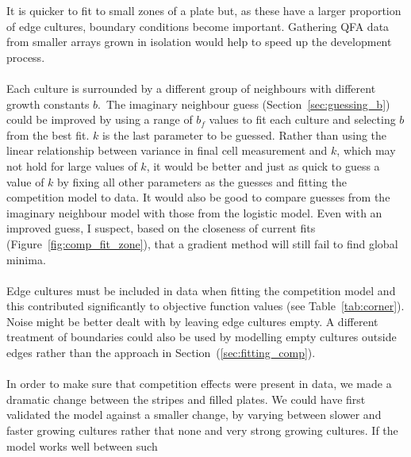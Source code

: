 It is quicker to fit to small zones of a plate but, as these have a
larger proportion of edge cultures, boundary conditions become
important. Gathering QFA data from smaller arrays grown in isolation
would help to speed up the development process.
\\\\
Each culture is surrounded by a different group of neighbours with
different growth constants \(b\).~The imaginary neighbour guess
(Section~\ref{sec:guessing_b}) could be improved by using a range of
\(b_{f}\) values to fit each culture and selecting \(b\) from the best
fit. \(k\) is the last parameter to be guessed. Rather than using the
linear relationship between variance in final cell measurement and
\(k\), which may not hold for large values of \(k\), it would be
better and just as quick to guess a value of \(k\) by fixing all other
parameters as the guesses and fitting the competition model to
data. It would also be good to compare guesses from the imaginary
neighbour model with those from the logistic model. Even with an
improved guess, I suspect, based on the closeness of current fits
(Figure~\ref{fig:comp_fit_zone}), that a gradient method will still
fail to find global minima.
\\\\
Edge cultures must be included in data when fitting the competition
model and this contributed significantly to objective function values
(see Table~\ref{tab:corner}). Noise might be better dealt with by
leaving edge cultures empty. A different treatment of boundaries could
also be used by modelling empty cultures outside edges rather than the
approach in Section~(\ref{sec:fitting_comp}).
\\\\
In order to make sure that competition effects were present in data,
we made a dramatic change between the stripes and filled plates. We
could have first validated the model against a smaller change, by
varying between slower and faster growing cultures rather that none
and very strong growing cultures. If the model works well between such
